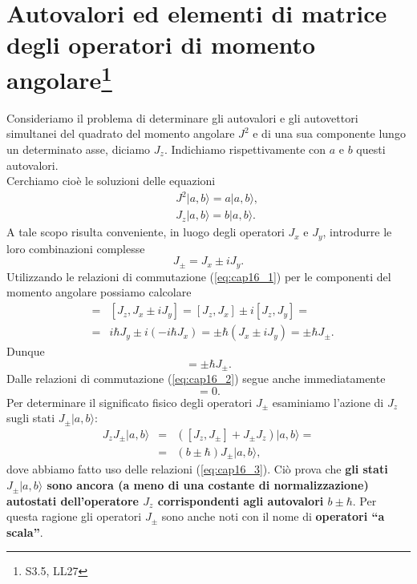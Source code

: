 \section[Autovalori ed elementi di matrice degli operatori di momento angolare]{Autovalori ed elementi di matrice degli operatori di momento angolare\footnote{S3.5, LL27}}
Consideriamo il problema di determinare gli autovalori e gli autovettori simultanei del quadrato del momento angolare $J^2$ e di una sua componente lungo un determinato asse, diciamo $J_z$. Indichiamo rispettivamente con $a$ e $b$ questi autovalori.\\
Cerchiamo cioè le soluzioni delle equazioni
\begin{eqnarray}
& &J^2 \vert a, b \rangle = a \vert a, b \rangle , \\
& &J_z \vert a, b \rangle = b \vert a, b \rangle .
\end{eqnarray}
A tale scopo risulta conveniente, in luogo degli operatori $J_x$ e $J_y$, introdurre le loro combinazioni complesse
\begin{equation}
J_{\pm} = J_x \pm i J_y .
\end{equation}
Utilizzando le relazioni di commutazione (\ref{eq:cap16_1}) per le componenti del momento angolare possiamo calcolare
\begin{eqnarray}
[J_z , J_{\pm}] & = & [J_z , J_x \pm i J_y] = [J_z , J_x] \pm i [J_z ,J_y] = \nonumber \\
& = & i\hbar J_y \pm i (-i\hbar J_x) = \pm \hbar (J_x \pm i J_y ) = \pm \hbar J_{\pm} .
\end{eqnarray}
Dunque
\begin{equation}
[J_z , J_{\pm}] = \pm \hbar J_{\pm} .
\label{eq:cap16_3}
\end{equation}
Dalle relazioni di commutazione (\ref{eq:cap16_2}) segue anche immediatamente
\begin{equation}
[J^2 , J_{\pm}]=0 .
\label{eq:cap16_4}
\end{equation}
Per determinare il significato fisico degli operatori $J_{\pm}$ esaminiamo l'azione di $J_z$ sugli stati $J_{\pm} \vert a, b \rangle$:
\begin{eqnarray}
J_zJ_{\pm} \vert a, b \rangle & =& \left( [J_z,J_{\pm}] + J_{\pm}J_{z}\right)\vert a, b \rangle = \nonumber \\
&=& (b \pm \hbar )J_{\pm} \vert a, b \rangle , 
\end{eqnarray}
dove abbiamo fatto uso delle relazioni (\ref{eq:cap16_3}). Ciò prova che \textbf{gli stati $ J_{\pm} \vert a, b \rangle$ sono ancora (a meno di una costante di normalizzazione) autostati dell'operatore $J_z$ corrispondenti agli autovalori $b\pm \hbar$}. Per questa ragione gli operatori $J_{\pm}$ sono anche noti con il nome di \textbf{operatori ``a scala''}.\\
